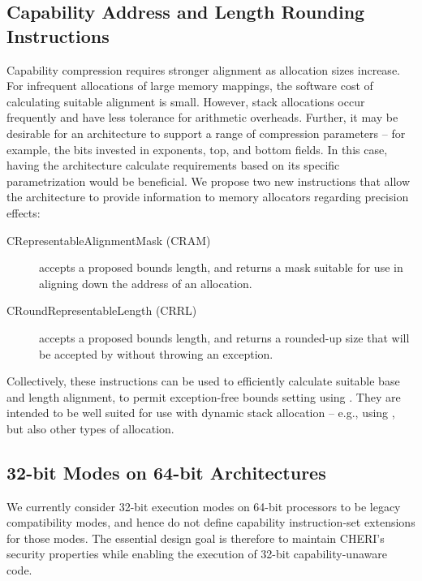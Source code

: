 \subsection{Capability Address and Length Rounding Instructions}
\label{sec:capability-address-and-length-rounding}

Capability compression requires stronger alignment as allocation sizes
increase.
For infrequent allocations of large memory mappings, the software cost of
calculating suitable alignment is small.
However, stack allocations occur frequently and have less tolerance for
arithmetic overheads.
Further, it may be desirable for an architecture to support a range of
compression parameters -- for example, the bits invested in exponents, top,
and bottom fields.
In this case, having the architecture calculate requirements based on its
specific parametrization would be beneficial.
We propose two new instructions that allow the architecture to provide
information to memory allocators regarding precision effects:

\begin{description}
\item[CRepresentableAlignmentMask (CRAM)]  accepts a proposed
  bounds length, and returns a mask suitable for use in aligning down the
  address of an allocation.

\item[CRoundRepresentableLength (CRRL)]  accepts a proposed
  bounds length, and returns a rounded-up size that will be accepted by
   without throwing an exception.
\end{description}

Collectively, these instructions can be used to efficiently calculate
suitable base and length alignment, to permit exception-free bounds setting
using .
They are intended to be well suited for use with dynamic stack allocation --
e.g., using , but also other types of allocation.

\subsection{32-bit Modes on 64-bit Architectures}

We currently consider 32-bit execution modes on 64-bit processors to be legacy
compatibility modes, and hence do not define capability instruction-set
extensions for those modes.
The essential design goal is therefore to maintain CHERI's security properties
while enabling the execution of 32-bit capability-unaware code.

